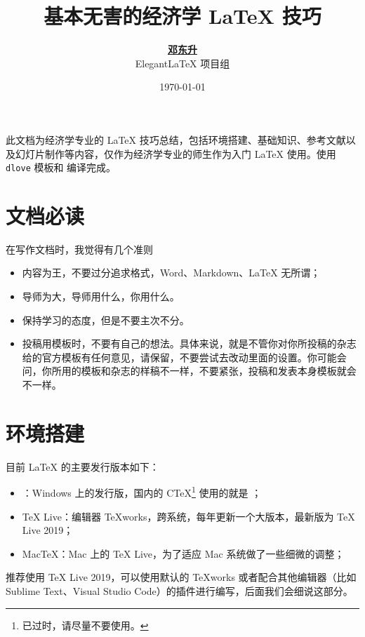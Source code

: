 \documentclass[11pt,a4paper]{dlove}
\title{\bfseries 基本无害的经济学 \LaTeX{} 技巧}
\author{\href{https://ddswhu.me/}{\bfseries 邓东升} \\  Elegant\LaTeX{} 项目组}
\date{\today}
\newcommand{\texmint}[1]{\texttt{#1}}
\begin{document}
\maketitle

此文档为经济学专业的 \LaTeX{} 技巧总结，包括环境搭建、基础知识、参考文献以及幻灯片制作等内容，仅作为经济学专业的师生作为入门 \LaTeX{} 使用。使用 \texmint{dlove} \heart{} 模板和  编译完成。

\section{文档必读}
在写作文档时，我觉得有几个准则
\begin{itemize}
  \item 内容为王，不要过分追求格式，Word、Markdown、\LaTeX{} 无所谓；
  \item 导师为大，导师用什么，你用什么。
  \item 保持学习的态度，但是不要主次不分。
  \item 投稿用模板时，不要有自己的想法。具体来说，就是不管你对你所投稿的杂志给的官方模板有任何意见，请保留，不要尝试去改动里面的设置。你可能会问，你所用的模板和杂志的样稿不一样，不要紧张，投稿和发表本身模板就会不一样。
\end{itemize}

\section{环境搭建}
目前 \LaTeX{} 的主要发行版本如下：
\begin{itemize}
  \item {}：Windows 上的发行版，国内的 C\TeX{}\footnote{已过时，请尽量不要使用。} 使用的就是 ；
  \item \TeX{} Live：编辑器 \TeX{}works，跨系统，每年更新一个大版本，最新版为 TeX Live 2019；
  \item Mac\TeX{}：Mac 上的 \TeX{} Live，为了适应 Mac 系统做了一些细微的调整；
\end{itemize}

推荐使用 \TeX{} Live 2019，可以使用默认的 \TeX{}works 或者配合其他编辑器（比如 Sublime Text、Visual Studio Code）的插件进行编写，后面我们会细说这部分。
\end{document}
